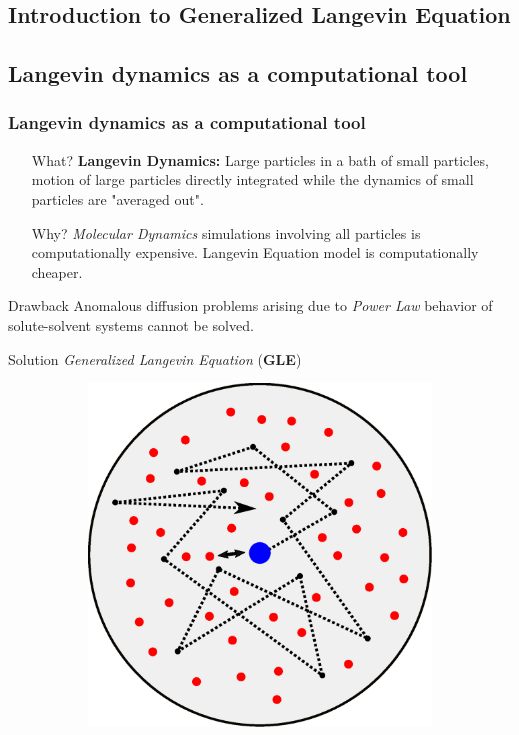 \documentclass[a4paper,10pt]{beamer}
\begin{document}
	\begin{frame}
		\small
		\section{Introduction to Generalized Langevin Equation}
		\subsection{Langevin dynamics as a computational tool}
		\frametitle{Langevin dynamics as a computational tool}
		\begin{itemize}
			\item[What?] {\textbf{Langevin Dynamics:} Large particles in a bath of small particles, motion of large particles directly integrated while the dynamics of small particles are "averaged out".}
			\item[Why?] {\textit{Molecular Dynamics} simulations involving all particles is computationally expensive. Langevin Equation model is computationally cheaper.}
		\end{itemize}
		\begin{minipage}{0.35\linewidth}
			\footnotesize
			\begin{alertblock}{Drawback}
				Anomalous diffusion problems arising due to \textit{Power Law} behavior of solute-solvent systems cannot be solved.
			\end{alertblock}
			\begin{exampleblock}{Solution}
				\textit{Generalized Langevin Equation} (\textbf{GLE})
			\end{exampleblock}
		\end{minipage}
		\hfill
		\begin{minipage}{0.6\linewidth}
			\centering
			\begin{figure}[H]
				\begin{subfigure}[b]{0.45\linewidth}
					\includegraphics[width=\linewidth]{./Plots/HeatBath.eps}

\end{subfigure}
\end{figure}
\end{minipage}
\end{frame}
\end{document}

